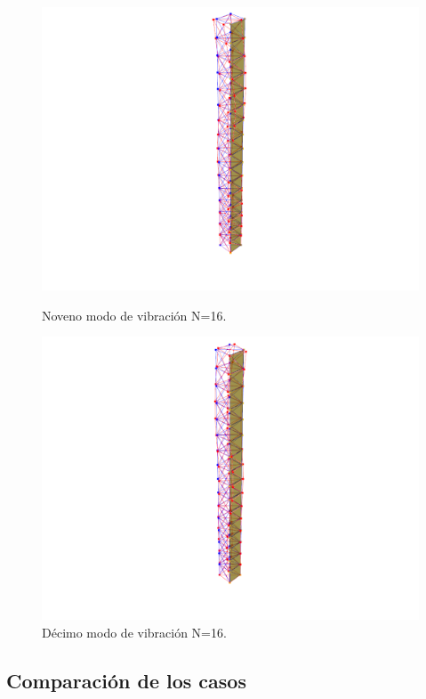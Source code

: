 \begin{figure}[H]
    \begin{minipage}[b]{0.5\textwidth}
        \centering
        \includegraphics[width=\textwidth]{FOTOS/mod9_16.png}
        \caption{Noveno modo de vibración N=16.}
    \end{minipage}
    \hfill
    \begin{minipage}[b]{0.5\textwidth}
        \centering
        \includegraphics[width=\textwidth]{FOTOS/mod10_16.png}
        \caption{Décimo modo de vibración N=16.}
    \end{minipage}
\end{figure}

\subsection{Comparación de los casos}

